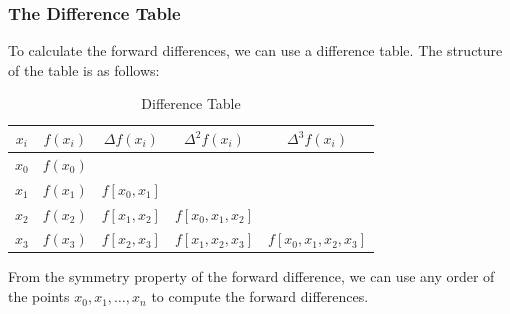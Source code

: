 \documentclass{matharticle}
\begin{document}
\subsubsection{The Difference Table}
To calculate the forward differences, we can use a difference table. The structure of the table is as follows:
\begin{table}
	\centering
	\begin{tabular}{c|c|c|c|c}
		$x_i$ & $f(x_i)$ & $\Delta f(x_i)$ & $\Delta^2 f(x_i)$  & $\Delta^3 f(x_i)$       \\
		\hline
		$x_0$ & $f(x_0)$ &                 &                    &                         \\
		$x_1$ & $f(x_1)$ & $f[x_0, x_1]$   &                    &                         \\
		$x_2$ & $f(x_2)$ & $f[x_1, x_2]$   & $f[x_0, x_1, x_2]$ &                         \\
		$x_3$ & $f(x_3)$ & $f[x_2, x_3]$   & $f[x_1, x_2, x_3]$ & $f[x_0, x_1, x_2, x_3]$ \\
	\end{tabular}
	\caption{Difference Table}
\end{table}
\begin{remark}
	From the symmetry property of the forward difference, we can use any order of the points $x_0, x_1, \ldots, x_n$ to compute the forward differences.
\end{remark}
\end{document}
